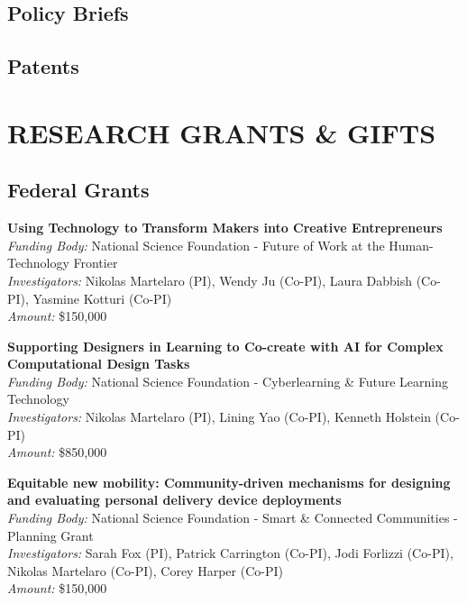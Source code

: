 \documentclass[11pt]{article} %
\begin{document}
\subsection*{Policy Briefs}
\begin{refsection}
\nocite{*}
\printbibliography[heading=none]
\end{refsection}

\subsection*{Patents}
\begin{refsection}
\nocite{*}
\printbibliography[heading=none]
\end{refsection}

\newpage
\section*{RESEARCH GRANTS \& GIFTS}
\subsection*{Federal Grants}

\textbf{Using Technology to Transform Makers into Creative Entrepreneurs}\\
\textit{Funding Body:} National Science Foundation - Future of Work at the Human-Technology Frontier\\
\textit{Investigators:} Nikolas Martelaro (PI), Wendy Ju (Co-PI), Laura Dabbish (Co-PI), Yasmine Kotturi (Co-PI)\\
\textit{Amount:} \$150,000
\medskip


\textbf{Supporting Designers in Learning to Co-create with AI for Complex Computational Design Tasks}\\
\textit{Funding Body:} National Science Foundation - Cyberlearning \& Future Learning Technology\\
\textit{Investigators:} Nikolas Martelaro (PI), Lining Yao (Co-PI), Kenneth Holstein (Co-PI)\\
\textit{Amount:} \$850,000
\medskip

\textbf{Equitable new mobility: Community-driven mechanisms for designing and evaluating personal delivery device deployments}\\
\textit{Funding Body:} National Science Foundation - Smart \& Connected Communities - Planning Grant\\
\textit{Investigators:} Sarah Fox (PI), Patrick  Carrington (Co-PI), Jodi Forlizzi (Co-PI), Nikolas Martelaro (Co-PI), Corey Harper (Co-PI)\\
\textit{Amount:} \$150,000
\medskip
\end{document}
